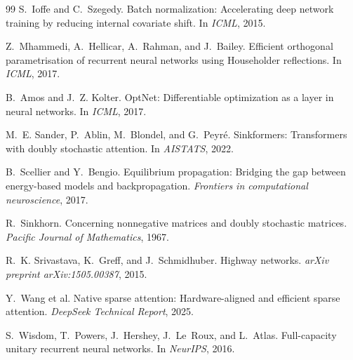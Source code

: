 \documentclass[11pt,a4paper]{article}
\begin{document}
\begin{thebibliography}{99}
S.~Ioffe and C.~Szegedy.
\newblock Batch normalization: Accelerating deep network training by reducing internal covariate shift.
\newblock In \emph{ICML}, 2015.

Z.~Mhammedi, A.~Hellicar, A.~Rahman, and J.~Bailey.
\newblock Efficient orthogonal parametrisation of recurrent neural networks using Householder reflections.
\newblock In \emph{ICML}, 2017.

B.~Amos and J.~Z. Kolter.
\newblock OptNet: Differentiable optimization as a layer in neural networks.
\newblock In \emph{ICML}, 2017.

M.~E. Sander, P.~Ablin, M.~Blondel, and G.~Peyré.
\newblock Sinkformers: Transformers with doubly stochastic attention.
\newblock In \emph{AISTATS}, 2022.

B.~Scellier and Y.~Bengio.
\newblock Equilibrium propagation: Bridging the gap between energy-based models and backpropagation.
\newblock \emph{Frontiers in computational neuroscience}, 2017.

R.~Sinkhorn.
\newblock Concerning nonnegative matrices and doubly stochastic matrices.
\newblock \emph{Pacific Journal of Mathematics}, 1967.

R.~K. Srivastava, K.~Greff, and J.~Schmidhuber.
\newblock Highway networks.
\newblock \emph{arXiv preprint arXiv:1505.00387}, 2015.

Y.~Wang et al.
\newblock Native sparse attention: Hardware-aligned and efficient sparse attention.
\newblock \emph{DeepSeek Technical Report}, 2025.

S.~Wisdom, T.~Powers, J.~Hershey, J.~Le~Roux, and L.~Atlas.
\newblock Full-capacity unitary recurrent neural networks.
\newblock In \emph{NeurIPS}, 2016.

\end{thebibliography}
\end{document}
